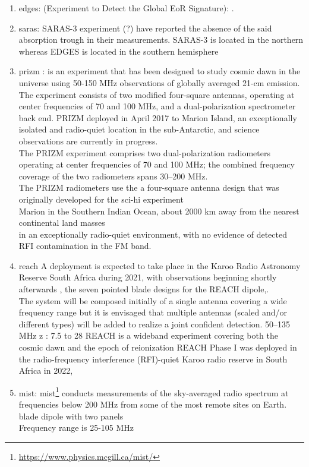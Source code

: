 \documentclass[12pt, TexShade, letterpaper]{report}
\begin{document}
\begin{enumerate}
\item \gls{edges}: (Experiment to Detect the Global EoR Signature): \cite{edges}.
\item \gls{saras}: SARAS-3 experiment (?) have reported the absence of the said absorption trough in their measurements. SARAS-3 is located in the northern whereas EDGES is located in the southern hemisphere \cite{hyperion_1}
\item \gls{prizm} \cite{prizm_2017, prizm_thesis}: is an experiment that has been designed to study cosmic dawn in the universe using 50-150 MHz observations of globally averaged 21-cm emission. The experiment consists of two modified four-square antennas, operating at center frequencies of 70 and 100 MHz, and a dual-polarization spectrometer back end. PRIZM deployed in April 2017 to Marion Island, an exceptionally isolated and radio-quiet location in the sub-Antarctic, and science observations are currently in progress. \cite{sci-hi_1, sci-hi_2}\\
The PRIZM experiment comprises two dual-polarization radiometers operating at center frequencies of 70 and 100 MHz; the combined frequency coverage of the two radiometers spans 30–200 MHz.\\
The PRIZM radiometers use the a four-square antenna design that was originally developed for the \gls{sci-hi} experiment\\
Marion in the Southern Indian Ocean, about 2000 km away from the nearest continental land masses\\
in an exceptionally radio-quiet environment, with no evidence of detected RFI contamination in the FM band.
\item \gls{reach}
A deployment is expected to take place in the Karoo Radio Astronomy Reserve South Africa during 2021, with observations beginning shortly afterwards , the seven pointed blade designs for the REACH dipole,\cite{reach_design}.\\
The system will be composed initially of a single antenna covering a wide frequency range but it is envisaged that multiple antennas (scaled and/or different types) will be added to realize a joint confident detection.\cite{reach}
50–135 MHz \cite{reach_design}
z : 7.5 to 28 \cite{reach_z}
REACH is a wideband experiment covering both the cosmic dawn and the epoch of reionization
REACH Phase I was deployed in the radio-frequency interference (RFI)-quiet Karoo radio reserve in South Africa in 2022, \cite{reach_z}
\item \gls{mist}:
 \gls{mist}\footnote{\hyperlink{https://www.physics.mcgill.ca/mist/}{https://www.physics.mcgill.ca/mist/}} \cite{mist} conducts measurements of the sky-averaged radio spectrum at frequencies below 200 MHz from some of the most remote sites on Earth.\\
 blade dipole with two panels\\
 Frequency range is 25-105 MHz
 

\end{enumerate}
\end{document}
